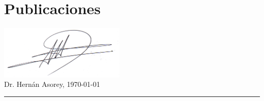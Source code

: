 \documentclass[11pt, a4paper]{article}
\newif\ifeng
\newif\ifres
\begin{document}




\ifres
~
\else

\fi




\ifres
  
\else
  
  \ifeng
    \section*{Publications}
  \else  
    \section*{Publicaciones}
  \fi
  
  
  
  
  
  
\fi
\vspace{-0.5cm}
\begin{flushright}
\includegraphics[width=0.45\textwidth]{firma}\\
\vspace*{-0.5cm}
Dr. Hernán Asorey, \today
\end{flushright}
\hrule
\appendix
  
  
\end{document}
